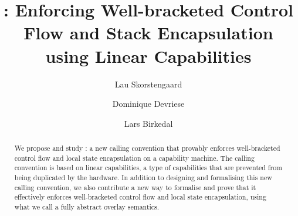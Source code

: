 \documentclass[acmsmall,review,anonymous]{acmart}\settopmatter{printfolios=true,printccs=false,printacmref=false}
\begin{document}
\title{\stktokens{}: Enforcing Well-bracketed Control Flow and Stack Encapsulation using Linear Capabilities}


\author{Lau Skorstengaard}

\author{Dominique Devriese}

\author{Lars Birkedal}

\begin{abstract}
  We propose and study \stktokens{}: a new calling convention that provably enforces well-bracketed control flow and local state encapsulation on a capability machine.
  The calling convention is based on linear capabilities, a type of capabilities that are prevented from being duplicated by the hardware.
  In addition to designing and formalising this new calling convention, we also contribute a new way to formalise and prove that it effectively enforces well-bracketed control flow and local state encapsulation, using what we call a fully abstract overlay semantics.
\end{abstract}


\end{document}
